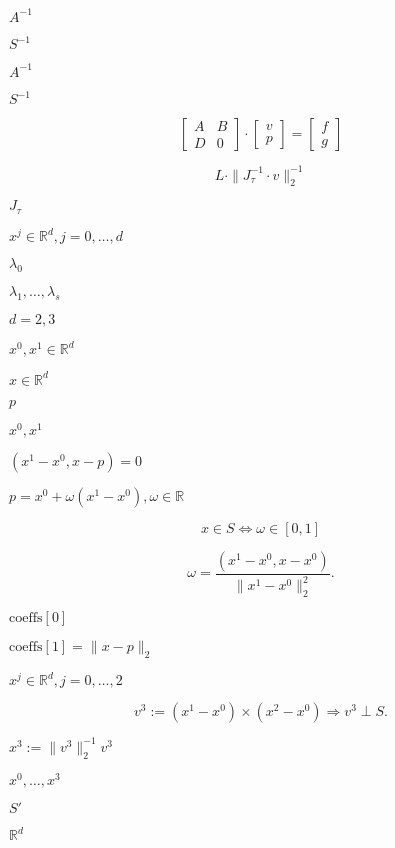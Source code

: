 \documentclass{article}
\begin{document}
$ A^{-1} $
\pagebreak

$ S^{-1} $
\pagebreak

$A^{-1}$
\pagebreak

$S^{-1}$
\pagebreak

\[\begin{bmatrix} A & B\\D & 0\end{bmatrix} \cdot \begin{bmatrix} v\\p\end{bmatrix} = \begin{bmatrix} f\\g\end{bmatrix}\]
\pagebreak

\[ L\cdot \| J_\tau^{-1} \cdot v \|_2^{-1} \]
\pagebreak

$J_\tau$
\pagebreak

$ x^j \in \mathbb{R}^d, j = 0, \dots, d $
\pagebreak

$ \lambda_0 $
\pagebreak

$ \lambda_1, \dots, \lambda_s $
\pagebreak

$ d=2, 3 $
\pagebreak

$ x^0, x^1 \in \mathbb{R}^d $
\pagebreak

$ x \in \mathbb{R}^d $
\pagebreak

$ p $
\pagebreak

$ x^0, x^1 $
\pagebreak

$ (x^1 - x^0, x - p) = 0 $
\pagebreak

$ p = x^0 + \omega (x^1 - x^0), \omega \in \mathbb{R} $
\pagebreak

\[
  x \in S \Leftrightarrow \omega \in [0, 1]
\]
\pagebreak

\[
  \omega = \frac{(x^1 - x^0, x - x^0)}{\| x^1 - x^0 \|_2^2}.
\]
\pagebreak

$ \mathrm{coeffs[0]} $
\pagebreak

$ \mathrm{coeffs[1]} = \| x - p \|_2 $
\pagebreak

$ x^j \in \mathbb{R}^d, j = 0, \dots, 2 $
\pagebreak

\[
  v^3 := (x^1 - x^0) \times (x^2 - x^0) \Rightarrow v^3 \perp S.
\]
\pagebreak

$ x^3 := \| v^3 \|_2^{-1} v^3 $
\pagebreak

$ x^0, \dots, x^3 $
\pagebreak

$ S' $
\pagebreak

$ \mathbb{R}^d$
\pagebreak
\end{document}
